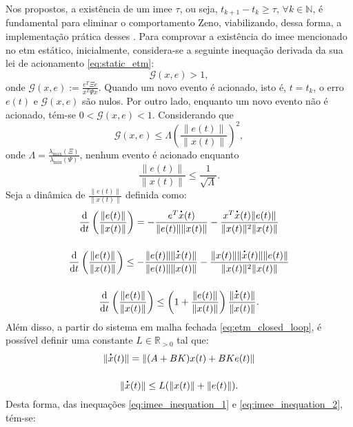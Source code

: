 Nos  propostos, a existência de um \acrshort{imee} $\tau$, ou seja, $t_{k+1} - t_k \geq \tau , \, \forall k \in \mathbb{N}$, é fundamental para eliminar o comportamento Zeno, viabilizando, dessa forma, a implementação prática desses . Para comprovar a existência do \acrshort{imee} mencionado no \acrshort{etm} estático, inicialmente, considera-se a seguinte inequação derivada da sua lei de acionamento \eqref{eq:static_etm}: \begin{equation}
  \mathcal{G}(x, e) > 1,
\end{equation} onde $\mathcal{G}(x, e) := \displaystyle \frac{e^T\Xi e}{x^T\Psi x}$. Quando um novo evento é acionado, isto é, $t = t_k$, o erro $e(t)$  e $\mathcal{G}(x, e)$ são nulos. Por outro lado, enquanto um novo evento não é acionado, tém-se $0 < \mathcal{G}(x, e) < 1$. Considerando que \begin{equation} \mathcal{G}(x, e) \leq \Lambda \left(\frac{\|e(t)\|}{\|x(t)\|}\right) ^ 2, \end{equation} onde $\Lambda = \displaystyle \frac{\lambda_{\max}(\Xi)}{\lambda_{\min}(\Psi)}$, nenhum evento é acionado enquanto \begin{equation}
  \frac{\|e(t)\|}{\|x(t)\|} \leq \frac{1}{\sqrt{\Lambda}}.
\end{equation} Seja a dinâmica de $\displaystyle \frac{\|e(t)\|}{\|x(t)\|}$ definida como: \begin{gather}
  \frac{\mathrm{d}}{\mathrm{d}t}\left(\frac{\|e(t)\|}{\|x(t)\|}\right) = - \frac{e^T\dt{x}(t)}{\|e(t)\|\|x(t)\|} - \frac{x^T\dt{x}(t) \|e(t)\|}{\|x(t)\|^2 \|x(t)\|} \notag \\[12pt]
  \frac{\mathrm{d}}{\mathrm{d}t}\left(\frac{\|e(t)\|}{\|x(t)\|}\right) \leq - \frac{\|e(t)\|\|\dt{x}(t)\|}{\|e(t)\|\|x(t)\|} - \frac{\|x(t)\| \|\dt{x}(t)\| \|e(t)\|}{\|x(t)\|^2 \|x(t)\|} \notag \\[12pt]
  \frac{\mathrm{d}}{\mathrm{d}t}\left(\frac{\|e(t)\|}{\|x(t)\|}\right) \leq \left( 1 + \frac{\|e(t)\|}{\|x(t)\|} \right) \frac{\|\dt{x}(t)\|}{\|x(t)\|}.
  \label{eq:imee_inequation_1}
\end{gather} Além disso, a partir do sistema em malha fechada \eqref{eq:etm_closed_loop}, é possível definir uma constante $L \in \mathbb{R}_{>0}$ tal que: \begin{gather}
  \|\dt{x}(t)\| = \| (A + BK) x(t) + BKe(t) \| \notag \\[12pt]
  \|\dt{x}(t)\| \leq L(\|x(t)\| + \|e(t)\|)
  \label{eq:imee_inequation_2}.
\end{gather} Desta forma, das inequações \eqref{eq:imee_inequation_1} e \eqref{eq:imee_inequation_2}, tém-se: \begin{gather}

\end{gather}
